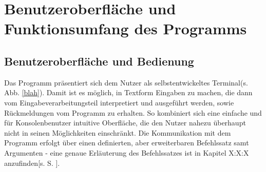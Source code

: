 \section{Benutzeroberfläche und Funktionsumfang des Programms}
\subsection{Benutzeroberfläche und Bedienung}

Das Programm präsentiert sich dem Nutzer als selbstentwickeltes Terminal(s. Abb. \ref{blah}). %
Damit ist es möglich, in Textform Eingaben zu machen, die dann vom Eingabeverarbeitungsteil interpretiert und ausgeführt werden, sowie Rückmeldungen vom Programm zu erhalten.
So kombiniert sich eine einfache und für Konsolenbenutzer intuitive Oberfläche, die den Nutzer nahezu überhaupt nicht in seinen Möglichkeiten einschränkt.
Die Kommunikation mit dem Programm erfolgt über einen definierten, aber erweiterbaren Befehlssatz samt Argumenten - eine genaue Erläuterung des Befehlssatzes ist in Kapitel X:X:X anzufinden[s. S. \pageref{blahkeineahnung}]. %
